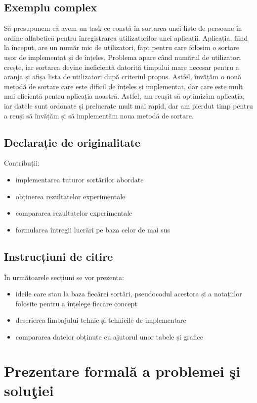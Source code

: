 \documentclass[12pt]{article}
\begin{document}
\subsection{Exemplu complex}
Să presupunem că avem un task ce constă în sortarea unei liste de persoane în ordine alfabetică pentru înregistrarea utilizatorilor unei aplicații. Aplicația, fiind la început, are un număr mic de utilizatori, fapt pentru care folosim o sortare ușor de implementat și de înțeles. Problema apare când numărul de utilizatori crește, iar sortarea devine ineficientă datorită timpului mare necesar pentru a aranja și afișa lista de utilizatori după criteriul propus. Astfel, învățăm o nouă metodă de sortare care este dificil de înțeles și implementat, dar care este mult mai eficientă pentru aplicația noastră. Astfel, am reușit să optimizăm aplicația, iar datele sunt ordonate și prelucrate mult mai rapid, dar am pierdut timp pentru a reuși să învățăm și să implementăm noua metodă de sortare.
\subsection{Declarație de originalitate}
Contribuții:
\begin{itemize}
    \item implementarea tuturor sortărilor abordate
    \item obținerea rezultatelor experimentale
    \item compararea rezultatelor experimentale
    \item formularea întregii lucrări pe baza celor de mai sus
\end{itemize}
\subsection{Instrucțiuni de citire}
În următoarele secțiuni se vor prezenta:
\begin{itemize}
    \item ideile care stau la baza fiecărei sortări, pseudocodul acestora și a notațiilor folosite pentru a înțelege fiecare concept
    \item descrierea limbajului tehnic și tehnicile de implementare
    \item compararea datelor obținute cu ajutorul unor tabele și grafice 
\end{itemize}

\section{Prezentare formală a problemei şi soluţiei}
\end{document}
